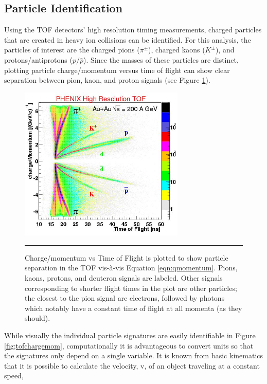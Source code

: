 \subsection{Particle Identification}
\label{sect:pidmethod}
Using the TOF detectors' high resolution timing measurements, charged particles that are created in heavy ion collisions can be identified. For this analysis, the particles of interest are the charged pions ($\pi^{\pm}$), charged kaons ($K^{\pm}$), and protons/antiprotons ($p/\bar{p}$). Since the masses of these particles are distinct, plotting particle charge/momentum versus time of flight can show clear separation between pion, kaon, and proton signals (see Figure \ref{fig:tofchargemom}). 

\begin{figure}[htbp!]
  \centering
    \includegraphics[width=0.7\textwidth]{Figures/tofchargemom.JPG}
    \rule{35em}{0.5pt}
  \caption[Particle separation in the TOF]{Charge/momentum vs Time of Flight \citep{tofchargemom} is plotted to show particle separation in the TOF vis-\`a-vis Equation \ref{eqn:qmomentum}. Pions, kaons, protons, and deuteron signals are labeled. Other signals corresponding to shorter flight times in the plot are other particles; the closest to the pion signal are electrons, followed by photons which notably have a constant time of flight at all momenta (as they should).}
  \label{fig:tofchargemom}
\end{figure}

While visually the individual particle signatures are easily identifiable in Figure \ref{fig;tofchargemom}, computationally it is advantageous to convert units so that the signatures only depend on a single variable. It is known from basic kinematics that it is possible to calculate the velocity, v, of an object traveling at a constant speed,

